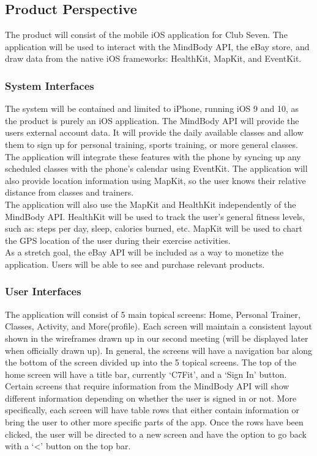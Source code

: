 \documentclass[letterpaper,10pt,titlepage]{article}
\begin{document}
\subsection{Product Perspective}

The product will consist of the mobile iOS application for Club Seven. The application will be used to interact with the MindBody API, the eBay store, and draw data from the native iOS frameworks: HealthKit, MapKit, and EventKit.

\subsubsection{System Interfaces}

The system will be contained and limited to iPhone, running iOS 9 and 10, as the product is purely an iOS application. The MindBody API will provide the users external account data. It will provide the daily available classes and allow them to sign up for personal training, sports training, or more general classes. The application will integrate these features with the phone by syncing up any scheduled classes with the phone's calendar using EventKit. The application will also provide location information using MapKit, so the user knows their relative distance from classes and trainers.\\

The application will also use the MapKit and HealthKit independently of the MindBody API. HealthKit will be used to track the user's general fitness levels, such as: steps per day, sleep, calories burned, etc. MapKit will be used to chart the GPS location of the user during their exercise activities.\\

As a stretch goal, the eBay API will be included as a way to monetize the application. Users will be able to see and purchase relevant products.

\subsubsection{User Interfaces}

The application will consist of 5 main topical screens: Home, Personal Trainer, Classes, Activity, and More(profile). Each screen will maintain a consistent layout shown in the wireframes drawn up in our second meeting (will be displayed later when officially drawn up). In general, the screens will have a navigation bar along the bottom of the screen divided up into the 5 topical screens. The top of the home screen will have a title bar, currently ‘C7Fit', and a ‘Sign In' button. Certain screens that require information from the MindBody API will show different information depending on whether the user is signed in or not. More specifically, each screen will have table rows that either contain information or bring the user to other more specific parts of the app. Once the rows have been clicked, the user will be directed to a new screen and have the option to go back with a ‘<' button on the top bar.
\end{document}
